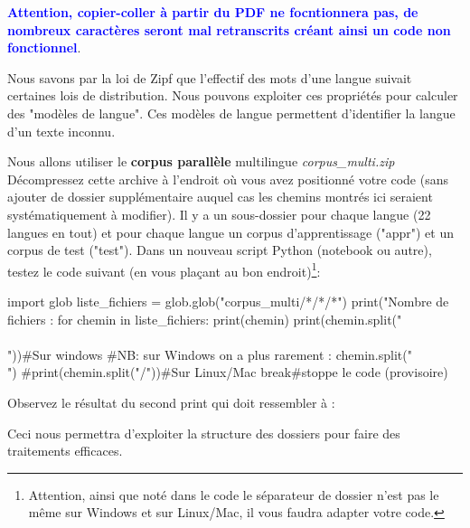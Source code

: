  \vspace{0.5cm}

\textbf{\textcolor{blue}{Attention, copier-coller à partir du PDF ne focntionnera pas, de nombreux caractères seront mal retranscrits créant ainsi un code non fonctionnel}}.


 Nous savons par la loi de Zipf que l'effectif des mots d'une langue suivait certaines lois de distribution.
 Nous pouvons exploiter ces propriétés pour calculer des "modèles de langue".
 Ces modèles de langue permettent d'identifier la langue d'un texte inconnu.

 Nous allons utiliser le \textbf{corpus parallèle} multilingue \textit{corpus\_multi.zip}
 Décompressez cette archive à l'endroit où vous avez positionné votre code (sans ajouter de dossier supplémentaire auquel cas les chemins montrés ici seraient systématiquement à modifier). Il y a un sous-dossier pour chaque langue (22 langues en tout) et pour chaque langue un corpus d'apprentissage ("appr") et un corpus de test ("test").
 Dans un nouveau script Python (notebook ou autre), testez le code suivant (en vous plaçant au bon endroit)\footnote{Attention, ainsi que noté dans le code le séparateur de dossier n'est pas le même sur Windows et sur Linux/Mac, il vous faudra adapter votre code.}:

\begin{python}
import glob
liste_fichiers = glob.glob("corpus_multi/*/*/*")
print("Nombre de fichiers : %
for chemin in liste_fichiers:
  print(chemin)
  print(chemin.split("\\\\"))#Sur windows
  #NB: sur Windows on a plus rarement : chemin.split("\\")
  #print(chemin.split("/"))#Sur Linux/Mac
  break#stoppe le code (provisoire)
\end{python}

Observez le résultat du second print qui doit ressembler à :

\begin{python}
\end{python}

Ceci nous permettra d'exploiter la structure des dossiers pour faire des traitements efficaces.

\vspace{0.5cm}
\vspace{0.5cm}

